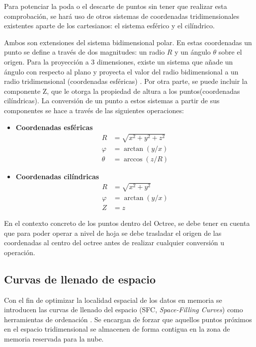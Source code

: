 Para potenciar la poda o el descarte de puntos sin tener que realizar esta comprobación, se hará uso de otros sistemas de coordenadas tridimensionales existentes aparte de los cartesianos: el sistema esférico y el cilíndrico.

Ambos son extensiones del sistema bidimensional polar. En estas coordenadas un punto se define a través de dos magnitudes: un radio $R$ y un ángulo $\theta$ sobre el origen. Para la proyección a 3 dimensiones, existe un sistema que añade un ángulo con respecto al plano y proyecta el valor del radio bidimensional a un radio tridimensional (coordenadas esféricas) \cite{wiki_coordenadas_esfericas}. Por otra parte, se puede incluir la componente Z, que le otorga la propiedad de altura a los puntos(coordenadas cilíndricas). 
La conversión de un punto a estos sistemas a partir de sus componentes se hace a través de las siguientes operaciones:
\begin{itemize}
    \item \textbf{Coordenadas esféricas} 
    \[
    \begin{aligned}
        R &= \sqrt{x^2 + y^2 + z^2} \\
        \varphi &= \arctan(y/x) \\
        \theta &= \arccos(z/R) 
    \end{aligned}
    \]

    \item \textbf{Coordenadas cilíndricas} 
    \[
    \begin{aligned}
        R &= \sqrt{x^2 + y^2} \\
        \varphi &= \arctan(y/x) \\
        Z &= z
    \end{aligned}
    \]
\end{itemize}

En el contexto concreto de los puntos dentro del Octree, se debe tener en cuenta que para poder operar a nivel de hoja se debe trasladar el origen de las coordenadas al centro del octree antes de realizar cualquier conversión u operación.

\subsection{Curvas de llenado de espacio}
Con el fin de optimizar la localidad espacial de los datos en memoria se introducen las curvas de llenado del espacio (SFC, \textit{Space-Filling Curves}) como herramientas de ordenación \cite{sfc_paper}. Se encargan de forzar que aquellos puntos próximos en el espacio tridimensional se almacenen de forma contigua en la zona de memoria reservada para la nube.

